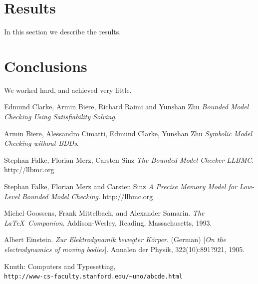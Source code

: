 \documentclass[14pt]{article}
\begin{document}
\section{Results}\label{results}
In this section we describe the results.

\section{Conclusions}\label{conclusions}
We worked hard, and achieved very little.

\begin{thebibliography}{9}
Edmund Clarke, Armin Biere, Richard Raimi and Yunshan Zhu
\textit{Bounded Model Checking Using Satisfiability Solving}.

Armin Biere, Alessandro Cimatti, Edmund Clarke, Yunshan Zhu
\textit{Symbolic Model Checking without BDDs}. 

Stephan Falke, Florian Merz, Carsten Sinz
\textit{The Bounded Model Checker LLBMC}. 
http://llbmc.org

Stephan Falke, Florian Merz and Carsten Sinz
\textit{A Precise Memory Model for Low-Level Bounded Model Checking}.
http://llbmc.org


Michel Goossens, Frank Mittelbach, and Alexander Samarin. 
\textit{The \LaTeX\ Companion}. 
Addison-Wesley, Reading, Massachusetts, 1993.
 
Albert Einstein. 
\textit{Zur Elektrodynamik bewegter K{\"o}rper}. (German) 
[\textit{On the electrodynamics of moving bodies}]. 
Annalen der Physik, 322(10):891?921, 1905.
 
Knuth: Computers and Typesetting,
\\\texttt{http://www-cs-faculty.stanford.edu/\~{}uno/abcde.html}
\end{thebibliography}
\end{document}

